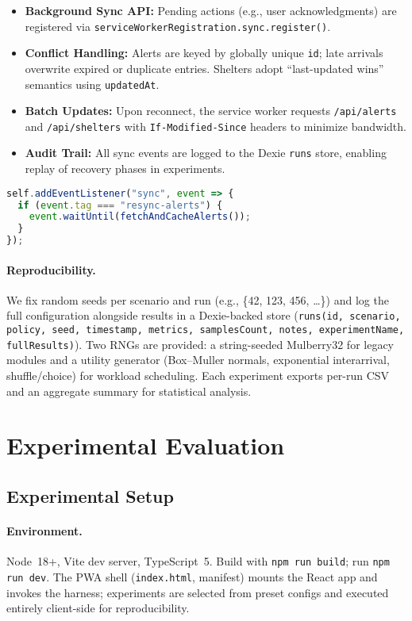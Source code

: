 \documentclass[11pt,twocolumn]{article}
\begin{document}
\begin{itemize}
    \item \textbf{Background Sync API:} Pending actions (e.g., user acknowledgments) are registered via \texttt{serviceWorkerRegistration.sync.register()}.
    \item \textbf{Conflict Handling:} Alerts are keyed by globally unique \texttt{id}; late arrivals overwrite expired or duplicate entries. Shelters adopt ``last-updated wins'' semantics using \texttt{updatedAt}.
    \item \textbf{Batch Updates:} Upon reconnect, the service worker requests \texttt{/api/alerts} and \texttt{/api/shelters} with \texttt{If-Modified-Since} headers to minimize bandwidth.
    \item \textbf{Audit Trail:} All sync events are logged to the Dexie \texttt{runs} store, enabling replay of recovery phases in experiments.
\end{itemize}

\begin{lstlisting}[language=JavaScript, caption={Background Sync Handler}]
self.addEventListener("sync", event => {
  if (event.tag === "resync-alerts") {
    event.waitUntil(fetchAndCacheAlerts());
  }
});
\end{lstlisting}

\paragraph{Reproducibility.}
We fix random seeds per scenario and run (e.g., \{42, 123, 456, \dots\}) and log the full configuration alongside results in a Dexie-backed store (\texttt{runs(id, scenario, policy, seed, timestamp, metrics, samplesCount, notes, experimentName, fullResults)}). Two RNGs are provided: a string-seeded Mulberry32 for legacy modules and a utility generator (Box--Muller normals, exponential interarrival, shuffle/choice) for workload scheduling. Each experiment exports per-run CSV and an aggregate summary for statistical analysis.

\section{Experimental Evaluation}

\subsection{Experimental Setup}

\paragraph{Environment.}
Node~18+, Vite dev server, TypeScript~5. Build with \texttt{npm run build}; run \texttt{npm run dev}. The PWA shell (\texttt{index.html}, manifest) mounts the React app and invokes the harness; experiments are selected from preset configs and executed entirely client-side for reproducibility.
\end{document}
